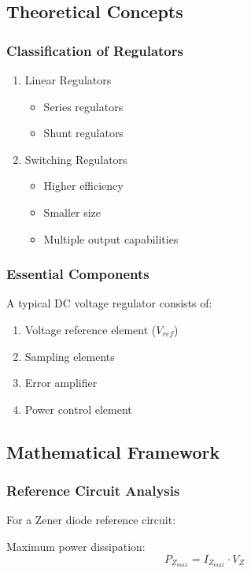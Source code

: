\documentclass[a4paper,9pt,twoside,openany,twocolumn]{memoir}
\begin{document}
\subsection{Theoretical Concepts}

\subsubsection{Classification of Regulators}
\begin{enumerate}
    \item Linear Regulators
    \begin{itemize}
        \item Series regulators
        \item Shunt regulators
    \end{itemize}
    
    \item Switching Regulators
    \begin{itemize}
        \item Higher efficiency
        \item Smaller size
        \item Multiple output capabilities
    \end{itemize}
\end{enumerate}

\subsubsection{Essential Components}
A typical DC voltage regulator consists of:
\begin{enumerate}
    \item Voltage reference element ($V_{ref}$)
    \item Sampling elements
    \item Error amplifier
    \item Power control element
\end{enumerate}

\subsection{Mathematical Framework}

\subsubsection{Reference Circuit Analysis}
For a Zener diode reference circuit:

Maximum power dissipation:
\[ P_{Z_{max}} = I_{Z_{max}} \cdot V_Z \]
\end{document}
